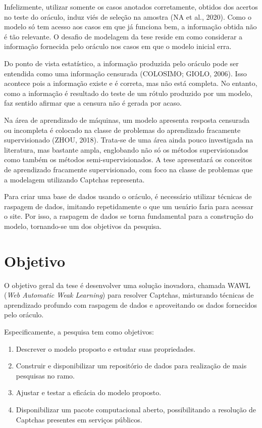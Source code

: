 \documentclass[12pt,twoside,brazilian]{book}
\providecommand{\tightlist}{%
  \setlength{\itemsep}{0pt}\setlength{\parskip}{0pt}}
\begin{document}
Infelizmente, utilizar somente os casos anotados corretamente, obtidos
dos acertos no teste do oráculo, induz viés de seleção na amostra (NA et
al., 2020). Como o modelo só tem acesso aos casos em que já funciona
bem, a informação obtida não é tão relevante. O desafio de modelagem da
tese reside em como considerar a informação fornecida pelo oráculo nos
casos em que o modelo inicial erra.

Do ponto de vista estatístico, a informação produzida pelo oráculo pode
ser entendida como uma informação censurada (COLOSIMO; GIOLO, 2006).
Isso acontece pois a informação existe e é correta, mas não está
completa. No entanto, como a informação é resultado do teste de um
rótulo produzido por um modelo, faz sentido afirmar que a censura não é
gerada por acaso.

Na área de aprendizado de máquinas, um modelo apresenta resposta
censurada ou incompleta é colocado na classe de problemas do aprendizado
fracamente supervisionado (ZHOU, 2018). Trata-se de uma área ainda pouco
investigada na literatura, mas bastante ampla, englobando não só os
métodos supervisionados como também os métodos semi-supervisionados. A
tese apresentará os conceitos de aprendizado fracamente supervisionado,
com foco na classe de problemas que a modelagem utilizando Captchas
representa.

Para criar uma base de dados usando o oráculo, é necessário utilizar
técnicas de raspagem de dados, imitando repetidamente o que um usuário
faria para acessar o site. Por isso, a raspagem de dados se torna
fundamental para a construção do modelo, tornando-se um dos objetivos da
pesquisa.

\hypertarget{sec-objetivos}{%
\section{Objetivo}\label{sec-objetivos}}

O objetivo geral da tese é desenvolver uma solução inovadora, chamada
WAWL (\emph{Web Automatic Weak Learning}) para resolver Captchas,
misturando técnicas de aprendizado profundo com raspagem de dados e
aproveitando os dados fornecidos pelo oráculo.

Especificamente, a pesquisa tem como objetivos:

\begin{enumerate}
\def\labelenumi{\arabic{enumi}.}
\tightlist
\item
  Descrever o modelo proposto e estudar suas propriedades.
\item
  Construir e disponibilizar um repositório de dados para realização de
  mais pesquisas no ramo.
\item
  Ajustar e testar a eficácia do modelo proposto.
\item
  Disponibilizar um pacote computacional aberto, possibilitando a
  resolução de Captchas presentes em serviços públicos.
\end{enumerate}
\end{document}
